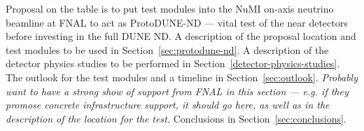 Proposal on the table is to put test modules into the NuMI on-axis neutrino beamline at FNAL to act as ProtoDUNE-ND --- vital test of the near detectors before investing in the full DUNE ND. A description of the proposal location and test modules to be used in Section~\ref{sec:protodune-nd}. A description of the detector physics studies to be performed in Section~\ref{detector-physics-studies}. The outlook for the test modules and a timeline in Section~\ref{sec:outlook}. {\it Probably want to have a strong show of support from FNAL in this section --- e.g. if they promose concrete infrastructure support, it should go here, as well as in the description of the location for the test.} Conclusions in Section~\ref{sec:conclusions}.


